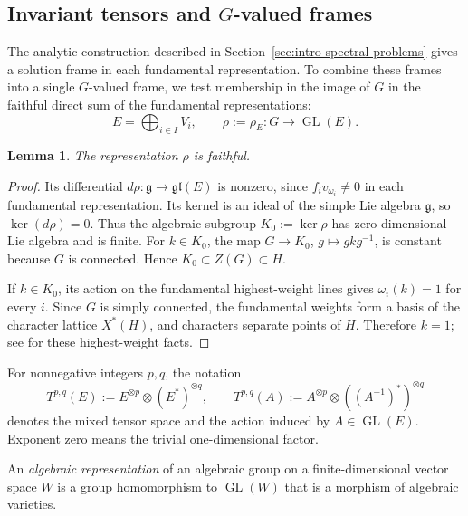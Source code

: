 \documentclass[11pt,leqno]{amsart}
\numberwithin{equation}{section}
\theoremstyle{plain}
\newtheorem{lemma}[theorem]{Lemma}
\theoremstyle{definition}
\theoremstyle{plain}
\theoremstyle{definition}
\theoremstyle{remark}
\newcommand{\g}{\mathfrak g}
\begin{document}
\subsection{Invariant tensors and \texorpdfstring{$G$}{G}-valued frames}\label{sec:finite-tensor-data}
The analytic construction described in Section~\ref{sec:intro-spectral-problems} gives a solution frame in each fundamental representation.  To combine these frames into a single $G$-valued frame, we test membership in the image of $G$ in the faithful direct sum of the fundamental representations:
\[
 E=\bigoplus_{i\in I}V_i,
 \qquad \rho:=\rho_{E}:G\longrightarrow\operatorname{GL}(E).
\]

\begin{lemma}\label{lem:faithful-fundamental-sum}
The representation $\rho$ is faithful.
\end{lemma}
\begin{proof}
Its differential $d\rho:\g\to\mathfrak{gl}(E)$ is nonzero, since $f_iv_{\omega_i}\ne0$ in each fundamental representation.  Its kernel is an ideal of the simple Lie algebra $\g$, so $\ker(d\rho)=0$.  Thus the algebraic subgroup $K_0:=\ker\rho$ has zero-dimensional Lie algebra and is finite.  For $k\in K_0$, the map $G\to K_0$, $g\mapsto gkg^{-1}$, is constant because $G$ is connected.  Hence $K_0\subset Z(G)\subset H$.

If $k\in K_0$, its action on the fundamental highest-weight lines gives $\omega_i(k)=1$ for every $i$.  Since $G$ is simply connected, the fundamental weights form a basis of the character lattice $X^*(H)$, and characters separate points of $H$.  Therefore $k=1$; see \cite[22.8 and Proposition~23.59]{Milne2017} for these highest-weight facts.
\end{proof}

For nonnegative integers $p,q$, the notation
\[
 T^{p,q}(E):=E^{\otimes p}\otimes(E^*)^{\otimes q},
 \qquad
 T^{p,q}(A):=A^{\otimes p}\otimes((A^{-1})^*)^{\otimes q}
\]
denotes the mixed tensor space and the action induced by $A\in\operatorname{GL}(E)$.  Exponent zero means the trivial one-dimensional factor.

An \emph{algebraic representation} of an algebraic group on a finite-dimensional vector space $W$ is a group homomorphism to $\operatorname{GL}(W)$ that is a morphism of algebraic varieties.
\end{document}
